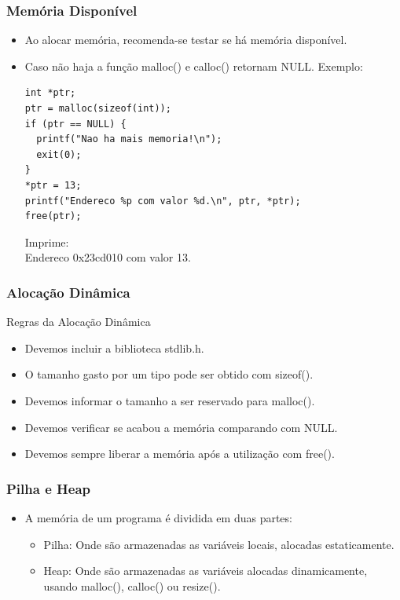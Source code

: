 \documentclass[aspectratio=169]{beamer}
\begin{document}

\begin{frame}[fragile]
\frametitle{Memória Disponível}
\begin{itemize}
\item Ao alocar memória, recomenda-se testar se há memória disponível. 
\item Caso não haja a função malloc() e calloc() retornam NULL. Exemplo:
\begin{lstlisting}
int *ptr;
ptr = malloc(sizeof(int));
if (ptr == NULL) {
  printf("Nao ha mais memoria!\n");
  exit(0);
}
*ptr = 13;
printf("Endereco %p com valor %d.\n", ptr, *ptr);
free(ptr);
\end{lstlisting} 
Imprime:\\
Endereco 0x23cd010 com valor 13.
\end{itemize}
\end{frame}


\begin{frame}
\frametitle{Alocação Dinâmica}
Regras da Alocação Dinâmica
\begin{itemize}
\item Devemos incluir a biblioteca stdlib.h.
\item O tamanho gasto por um tipo pode ser obtido com sizeof().
\item Devemos informar o tamanho a ser reservado para malloc().
\item Devemos verificar se acabou a memória comparando com NULL.
\item Devemos sempre liberar a memória após a utilização com free().
\end{itemize}
\end{frame}


\begin{frame}
\frametitle{Pilha e Heap}
\begin{itemize}
\item A memória de um programa é dividida em duas partes:
\begin{itemize}
\item Pilha: Onde são armazenadas as variáveis locais, alocadas estaticamente.
\item Heap: Onde são armazenadas as variáveis alocadas dinamicamente, usando malloc(), calloc() ou resize().
\end{itemize}
\end{itemize}
\end{frame}
\end{document}
